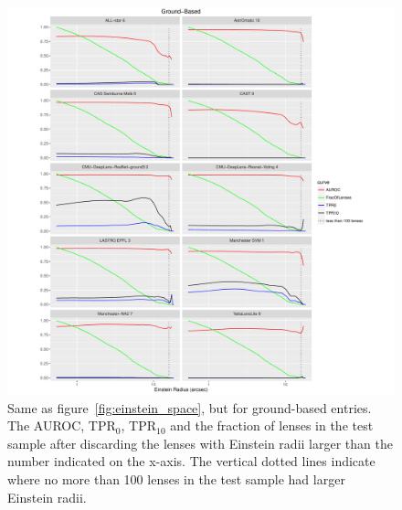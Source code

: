 \documentclass{aa}
\begin{document}
\begin{figure}
 \includegraphics[width=2\columnwidth]{figures/einstein_ground.pdf}
 \caption{Same as figure~\ref{fig:einstein_space}, but for ground-based entries.  The AUROC, TPR$_0$, TPR$_{10}$ and the fraction of lenses in the test sample after discarding the lenses with Einstein radii larger than the number indicated on the x-axis. The vertical dotted lines indicate where no more than 100 lenses in the test sample had larger Einstein radii.  }
 \label{fig:einstein_ground}
\end{figure}
\end{document}
